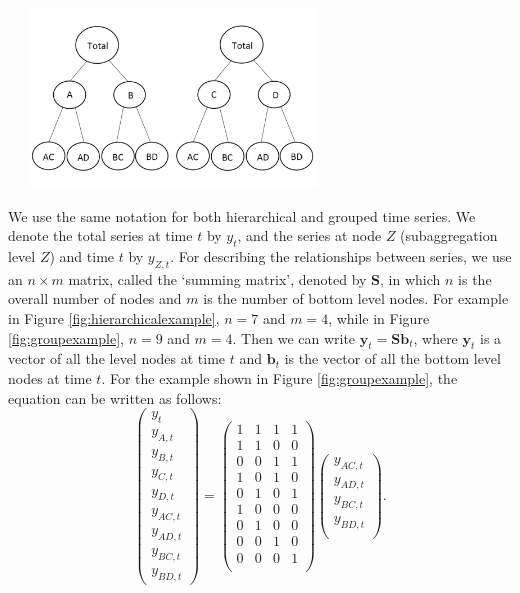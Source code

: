 \documentclass[11pt,a4paper,]{article}
\let\origfigure\figure
\let\endorigfigure\endfigure
\renewenvironment{figure}[1][2] {
    \expandafter\origfigure\expandafter[!htbp]
} {
    \endorigfigure
}
\begin{document}
\begin{figure}

{\centering \includegraphics[width=330px,height=180px]{hcf_files/figure-latex/groupexample-1} 

}

\caption{An example of a two level grouped structure.}\label{fig:groupexample}
\end{figure}

We use the same notation \autocite[following][]{fpp2} for both hierarchical and grouped time series. We denote the total series at time \(t\) by \(y_t\), and the series at node \(Z\) (subaggregation level \(Z\)) and time \(t\) by \(y_{Z,t}\). For describing the relationships between series, we use an \(n\times m\) matrix, called the `summing matrix', denoted by \(\bm{S}\), in which \(n\) is the overall number of nodes and \(m\) is the number of bottom level nodes. For example in Figure \ref{fig:hierarchicalexample}, \(n = 7\) and \(m = 4\), while in Figure \ref{fig:groupexample}, \(n=9\) and \(m=4\). Then we can write \(\bm{y}_t=\bm{S}\bm{b}_t\), where \(\bm{y}_t\) is a vector of all the level nodes at time \(t\) and \(\bm{b}_t\) is the vector of all the bottom level nodes at time \(t\). For the example shown in Figure \ref{fig:groupexample}, the equation can be written as follows:
\begin{equation}\label{eq:Smatrixexample}
\begin{pmatrix}
  y_{t}\\y_{A,t}\\y_{B,t}\\y_{C,t}\\y_{D,t}\\y_{AC,t}\\y_{AD,t}\\y_{BC,t}\\y_{BD,t}
\end{pmatrix} =
\begin{pmatrix}
  1&1&1&1\\1&1&0&0\\0&0&1&1\\1&0&1&0\\0&1&0&1\\1&0&0&0\\0&1&0&0\\0&0&1&0\\0&0&0&1\\
\end{pmatrix}
\begin{pmatrix}
  y_{AC,t}\\y_{AD,t}\\y_{BC,t}\\y_{BD,t}\\
\end{pmatrix}.
\end{equation}
\end{document}
